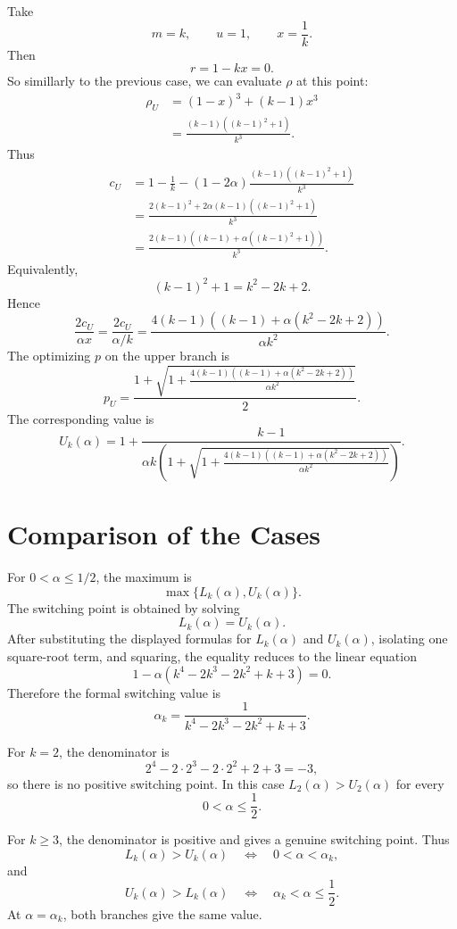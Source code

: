 \documentclass[11pt]{article}
\begin{document}
Take
\[
        m=k,\qquad u=1,\qquad x=\frac1k.
\]
Then
\[
        r=1-kx=0.
\]
So simillarly to the previous case, we can evaluate \(\rho\) at this point:
\[
\begin{aligned}
\rho_U
&=
(1-x)^3+(k-1)x^3 \\
&=
\frac{(k-1)\left((k-1)^2+1\right)}{k^3}.
\end{aligned}
\]
Thus
\[
\begin{aligned}
c_U
&=
1-\frac1k
-(1-2\alpha)
\frac{(k-1)\left((k-1)^2+1\right)}{k^3} \\
&=
\frac{
2(k-1)^2
 +2\alpha(k-1)\left((k-1)^2+1\right)
}{k^3} \\
&=
\frac{
2(k-1)\left((k-1)+\alpha\left((k-1)^2+1\right)\right)
}{k^3}.
\end{aligned}
\]
Equivalently,
\[
        (k-1)^2+1=k^2-2k+2.
\]
Hence
\[
\frac{2c_U}{\alpha x}
=
\frac{2c_U}{\alpha/k}
=
\frac{
4(k-1)\left((k-1)+\alpha(k^2-2k+2)\right)
}{\alpha k^2}.
\]
The optimizing \(p\) on the upper branch is
\[
\boxed{
p_U
=
\frac{
1+\sqrt{
1+
\frac{
4(k-1)\left((k-1)+\alpha(k^2-2k+2)\right)
}{\alpha k^2}
}
}{2}
}.
\]
The corresponding value is
\[
\boxed{
U_k(\alpha)
=
1+
\frac{k-1}{
\alpha k\left(
1+\sqrt{
1+
\frac{
4(k-1)\left((k-1)+\alpha(k^2-2k+2)\right)
}{\alpha k^2}
}
\right)}
}.
\]

\section{Comparison of the Cases}

For \(0<\alpha\leq 1/2\), the maximum is
\[
        \max\{L_k(\alpha),U_k(\alpha)\}.
\]
The switching point is obtained by solving
\[
        L_k(\alpha)=U_k(\alpha).
\]
After substituting the displayed formulas for \(L_k(\alpha)\) and \(U_k(\alpha)\), isolating one square-root term, and squaring, the equality reduces to the linear equation
\[
        1-\alpha\left(k^4-2k^3-2k^2+k+3\right)=0.
\]
Therefore the formal switching value is
\[
\boxed{
        \alpha_k=
        \frac{1}{k^4-2k^3-2k^2+k+3}
        }.
\]

For \(k=2\), the denominator is
\[
        2^4-2\cdot 2^3-2\cdot 2^2+2+3
        =
        -3,
\]
so there is no positive switching point. In this case \(L_2(\alpha)>U_2(\alpha)\) for every
\[
        0<\alpha\leq \frac12.
\]

For \(k\geq 3\), the denominator is positive and gives a genuine switching point. Thus
\[
        L_k(\alpha)>U_k(\alpha)
        \quad\Longleftrightarrow\quad
        0<\alpha<\alpha_k,
\]
and
\[
        U_k(\alpha)>L_k(\alpha)
        \quad\Longleftrightarrow\quad
        \alpha_k<\alpha\leq \frac12.
\]
At \(\alpha=\alpha_k\), both branches give the same value.
\end{document}
